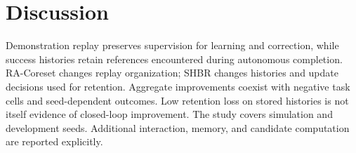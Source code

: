 \section{Discussion}
Demonstration replay preserves supervision for learning and correction,
while success histories retain references encountered during autonomous
completion. RA-Coreset changes replay organization; SHBR changes histories
and update decisions used for retention. Aggregate improvements coexist
with negative task cells and seed-dependent outcomes. Low retention loss
on stored histories is not itself evidence of closed-loop improvement.
The study covers simulation and development seeds. Additional interaction,
memory, and candidate computation are reported explicitly.
